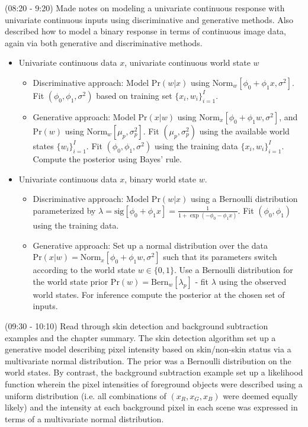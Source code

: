 \documentclass[idxtotoc,hyperref,openany]{labbook} %
\begin{document}
(08:20 - 9:20) Made notes on modeling a univariate continuous response with univariate continuous inputs using discriminative and generative methods. Also described how to model a binary response in terms of continuous image data, again via both generative and discriminative methods. 
 
\begin{itemize}
\item Univariate continuous data $x$, univariate continuous world state $w$
	\begin{itemize}
		\item Discriminative approach: Model $\text{Pr}(w|x)$ using $\text{Norm}_{w}[\phi_0 + \phi_1 x, \sigma^2]$. Fit $(\phi_0, \phi_1, \sigma^2)$ based on training set $\{x_i, w_i\}_{i = 1}^I$.
		\item Generative approach: Model $\text{Pr}(x|w)$ using $\text{Norm}_{x}[\phi_0 + \phi_1 w, \sigma^2]$, and $\text{Pr}(w)$  using $\text{Norm}_w [\mu_p, \sigma_p^2]$. Fit $(\mu_p, \sigma_p^2)$ using the available world states $\{w_i\}_{i = 1}^I$. Fit $(\phi_0, \phi_1, \sigma^2)$ using the training data $\{x_i, w_i\}_{i = 1}^I$. Compute the posterior using Bayes' rule. 
	\end{itemize}
\item Univariate continuous data $x$, binary world state $w$.
	\begin{itemize}
		\item Discriminative approach: Model $\text{Pr}(w|x)$ using a Bernoulli distribution parameterized by $\lambda = \text{sig}[\phi_0 + \phi_1 x] = \frac{1}{1 + \exp(-\phi_0 - \phi_1 x)}$. Fit $(\phi_0, \phi_1)$ using the training data.
		\item Generative approach: Set up a normal distribution over the data $\text{Pr}(x|w) = \text{Norm}_x[\phi_0 + \phi_1 w, \sigma^2]$ such that its parameters switch according to the world state $w \in \{0, 1\}$. Use a Bernoulli distribution for the world state prior $\text{Pr}(w) = \text{Bern}_w [\lambda_p]$ - fit $\lambda$ using the observed world states. For inference compute the posterior at the chosen set of inputs.
	\end{itemize}
\end{itemize}

(09:30 - 10:10) Read through skin detection and background subtraction examples and the chapter summary. The skin detection algorithm set up a generative model describing pixel intensity based on skin/non-skin status via a multivariate normal distribution. The prior was a Bernoulli distribution on the world states. By contrast, the background subtraction example set up a likelihood function wherein the pixel intensities of foreground objects were described using a uniform distribution (i.e. all combinations of $(x_R, x_G, x_B)$ were deemed equally likely) and the intensity at each background pixel  in each scene was expressed in terms of a multivariate normal distribution.
\end{document}
